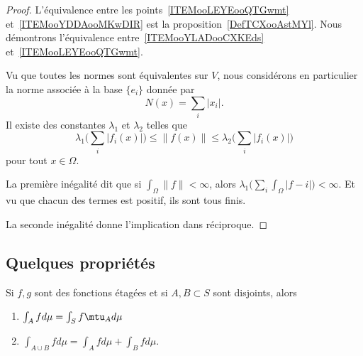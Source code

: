 \begin{proof}
    L'équivalence entre les points~\ref{ITEMooLEYEooQTGwmt} et~\ref{ITEMooYDDAooMKwDIR} est la proposition~\ref{DefTCXooAstMYl}. Nous démontrons l'équivalence entre~\ref{ITEMooYLADooCXKEds} et~\ref{ITEMooLEYEooQTGwmt}.

    Vu que toutes les normes sont équivalentes sur \( V\), nous considérons en particulier la norme associée à la base \( \{ e_i \}\) donnée par
    \begin{equation}
        N(x)=\sum_i| x_i |.
    \end{equation}
    Il existe des constantes \( \lambda_1\) et \( \lambda_2\) telles que
    \begin{equation}
        \lambda_1\big( \sum_i| f_i(x) | \big)\leq \| f(x) \|\leq \lambda_2\big( \sum_i| f_i(x) | \big)
    \end{equation}
    pour tout \( x\in \Omega\).

    La première inégalité dit que si \( \int_{\Omega}\| f \|<\infty\), alors \( \lambda_1\big( \sum_i\int_{\Omega}| f-i | \big)<\infty\). Et vu que chacun des termes est positif, ils sont tous finis.

    La seconde inégalité donne l'implication dans réciproque.
\end{proof}

\subsection{Quelques propriétés}

\begin{proposition}
    Si \( f,g\) sont des fonctions étagées et si \( A,B\subset S\) sont disjoints, alors
    \begin{enumerate}
        \item
            \( \int_Afd\mu=\int_Sf\mtu_Ad\mu\)
        \item
            \( \int_{A\cup B}fd\mu=\int_Afd\mu+\int_Bfd\mu\).
    \end{enumerate}
\end{proposition}

